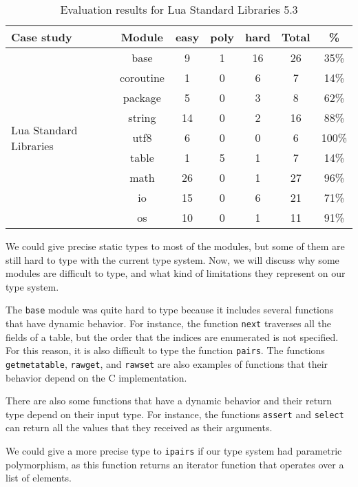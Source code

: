 \begin{table}[!ht]
\begin{center}
\begin{tabular}{|l|c|c|c|c|c|c|}
\hline
\textbf{Case study} & \textbf{Module} & \textbf{easy} & \textbf{poly} & \textbf{hard} & \textbf{Total} & \textbf{\%} \\
\hline
\multirow{9}{*}{Lua Standard Libraries}
& base & 9 & 1 & 16 & 26 & 35\% \\
\cline{2-7}
& coroutine & 1 & 0 & 6 & 7 & 14\% \\
\cline{2-7}
& package & 5 & 0 & 3 & 8 & 62\% \\
\cline{2-7}
& string & 14 & 0 & 2 & 16 & 88\% \\
\cline{2-7}
& utf8 & 6 & 0 & 0 & 6 & 100\% \\
\cline{2-7}
& table & 1 & 5 & 1 & 7 & 14\% \\
\cline{2-7}
& math & 26 & 0 & 1 & 27 & 96\% \\
\cline{2-7}
& io & 15 & 0 & 6 & 21 & 71\% \\
\cline{2-7}
& os & 10 & 0 & 1 & 11 & 91\% \\
\hline
\end{tabular}
\end{center}
\caption{Evaluation results for Lua Standard Libraries 5.3}
\label{tab:evallsl53}
\end{table}

We could give precise static types to most of the modules,
but some of them are still hard to type with the current type
system.
Now, we will discuss why some modules are difficult to type,
and what kind of limitations they represent on our type system.

The \texttt{base} module was quite hard to type because it
includes several functions that have dynamic behavior.
For instance, the function \texttt{next} traverses all the
fields of a table, but the order that the indices are
enumerated is not specified.
For this reason, it is also difficult to type the function
\texttt{pairs}.
The functions \texttt{getmetatable},  \texttt{rawget}, and
\texttt{rawset} are also examples of functions that their
behavior depend on the C implementation.

There are also some functions that have a dynamic behavior and
their return type depend on their input type.
For instance, the functions \texttt{assert} and \texttt{select}
can return all the values that they received as their arguments.

We could give a more precise type to \texttt{ipairs} if our
type system had parametric polymorphism, as this function
returns an iterator function that operates over a list of
elements.

